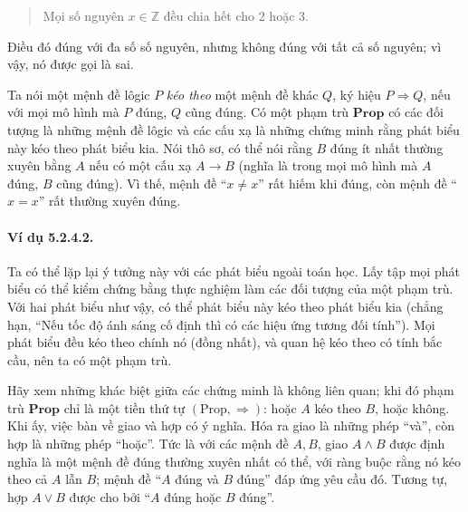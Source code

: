 \begin{quote}Mọi số nguyên $x\in\mathbb Z$ đều chia hết cho 2 hoặc 3.\end{quote}
Điều đó đúng với đa số số nguyên, nhưng không đúng với tất cả số nguyên; vì vậy, nó được gọi là sai.

Ta nói một mệnh đề lôgic $P$ \emph{kéo theo} một mệnh đề khác $Q$, ký hiệu $P\Rightarrow Q$, nếu với mọi mô hình mà $P$ đúng, $Q$ cũng đúng. Có một phạm trù $\mathbf{Prop}$ có các đối tượng là những mệnh đề lôgic và các cấu xạ là những chứng minh rằng phát biểu này kéo theo phát biểu kia. Nói thô sơ, có thể nói rằng $B$ đúng ít nhất thường xuyên bằng $A$ nếu có một cấu xạ $A\to B$ (nghĩa là trong mọi mô hình mà $A$ đúng, $B$ cũng đúng). Vì thế, mệnh đề ``$x\ne x$'' rất hiếm khi đúng, còn mệnh đề ``$x=x$'' rất thường xuyên đúng.
\paragraph{Ví dụ 5.2.4.2.} Ta có thể lặp lại ý tưởng này với các phát biểu ngoài toán học. Lấy tập mọi phát biểu có thể kiểm chứng bằng thực nghiệm làm các đối tượng của một phạm trù. Với hai phát biểu như vậy, có thể phát biểu này kéo theo phát biểu kia (chẳng hạn, ``Nếu tốc độ ánh sáng cố định thì có các hiệu ứng tương đối tính''). Mọi phát biểu đều kéo theo chính nó (đồng nhất), và quan hệ kéo theo có tính bắc cầu, nên ta có một phạm trù.

Hãy xem những khác biệt giữa các chứng minh là không liên quan; khi đó phạm trù $\mathbf{Prop}$ chỉ là một tiền thứ tự $(\mathrm{Prop},\Rightarrow)$: hoặc $A$ kéo theo $B$, hoặc không. Khi ấy, việc bàn về giao và hợp có ý nghĩa. Hóa ra giao là những phép ``và'', còn hợp là những phép ``hoặc''. Tức là với các mệnh đề $A,B$, giao $A\wedge B$ được định nghĩa là một mệnh đề đúng thường xuyên nhất có thể, với ràng buộc rằng nó kéo theo cả $A$ lẫn $B$; mệnh đề ``$A$ đúng và $B$ đúng'' đáp ứng yêu cầu đó. Tương tự, hợp $A\vee B$ được cho bởi ``$A$ đúng hoặc $B$ đúng''.
